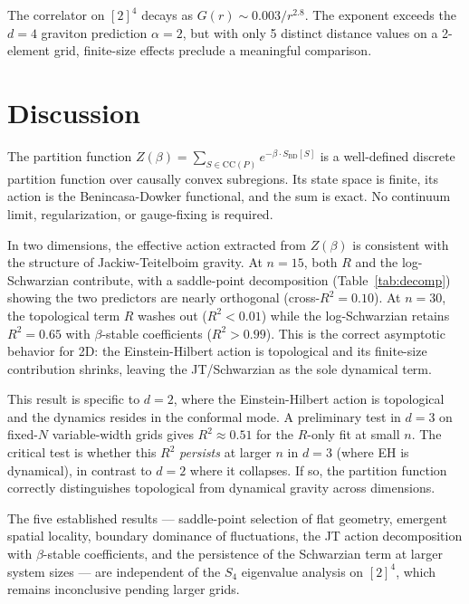 \documentclass[aps,prd,twocolumn,superscriptaddress]{revtex4-2}
\begin{document}
The correlator on $[2]^4$ decays as $G(r) \sim 0.003/r^{2.8}$.
The exponent exceeds the $d = 4$ graviton prediction $\alpha = 2$,
but with only 5 distinct distance values on a 2-element grid,
finite-size effects preclude a meaningful comparison.


\section{Discussion}

The partition function $Z(\beta) = \sum_{S \in \mathrm{CC}(P)}
e^{-\beta \cdot S_{\mathrm{BD}}[S]}$ is a well-defined discrete
partition function over causally convex subregions. Its state space is finite,
its action is the Benincasa-Dowker functional, and the
sum is exact. No continuum limit, regularization, or gauge-fixing
is required.

In two dimensions, the effective action extracted from $Z(\beta)$
is consistent with the structure of Jackiw-Teitelboim gravity. At $n = 15$,
both $R$ and the log-Schwarzian contribute, with a saddle-point
decomposition (Table~\ref{tab:decomp}) showing the two predictors
are nearly orthogonal (cross-$R^2 = 0.10$). At $n = 30$, the
topological term $R$ washes out ($R^2 < 0.01$) while the
log-Schwarzian retains $R^2 = 0.65$ with $\beta$-stable coefficients
($R^2 > 0.99$). This is the correct asymptotic behavior for 2D:
the Einstein-Hilbert action is topological and its finite-size
contribution shrinks, leaving the JT/Schwarzian as the sole
dynamical term.

This result is specific to $d = 2$, where the Einstein-Hilbert
action is topological and the dynamics resides in the conformal
mode. A preliminary test in $d = 3$ on fixed-$N$ variable-width
grids gives $R^2 \approx 0.51$ for the $R$-only fit at small $n$.
The critical test is whether this $R^2$ \emph{persists} at larger
$n$ in $d = 3$ (where EH is dynamical), in contrast to $d = 2$
where it collapses. If so, the partition function correctly
distinguishes topological from dynamical gravity across dimensions.

The five established results --- saddle-point selection of flat
geometry, emergent spatial locality, boundary dominance of
fluctuations, the JT action decomposition with $\beta$-stable
coefficients, and the persistence of the Schwarzian term at larger
system sizes --- are independent of the $S_4$ eigenvalue analysis
on $[2]^4$, which remains inconclusive pending larger grids.
\end{document}
